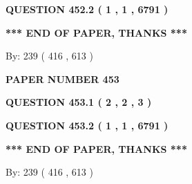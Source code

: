 \documentclass[12pt]{article}
\begin{document}
  
  
\vspace{0.2in}
  
{\textbf{\Large{QUESTION
452.2 
 ( 1 , 1 , 6791 )
}}}
  
  
   
   
 \vspace{0.2in}
 
   
   
   
   
\vspace{1.0in} 
{\textbf{\large{ *** END OF PAPER, THANKS *** }}} 
   
   
\hspace{1.0in} By: 
 239 ( 416 ,  613 )
   
   
   
   
\newpage 
\setcounter{page}{ 
   453001 } 
   
   
   
   
 {\textbf{ \Large{ PAPER NUMBER  453  }}}
   
   
\vspace{0.2in}
   
   
   
   
   
   
 \vspace{0.2in}
 
 
 
 
   
   
  
\vspace{0.2in}
  
{\textbf{\Large{QUESTION
453.1 
 ( 2 , 2 , 3 )
}}}
  
  
  
\vspace{0.2in}
  
{\textbf{\Large{QUESTION
453.2 
 ( 1 , 1 , 6791 )
}}}
  
  
   
   
 \vspace{0.2in}
 
   
   
   
   
\vspace{1.0in} 
{\textbf{\large{ *** END OF PAPER, THANKS *** }}} 
   
   
\hspace{1.0in} By: 
 239 ( 416 ,  613 )
   
   
   
\end{document}
